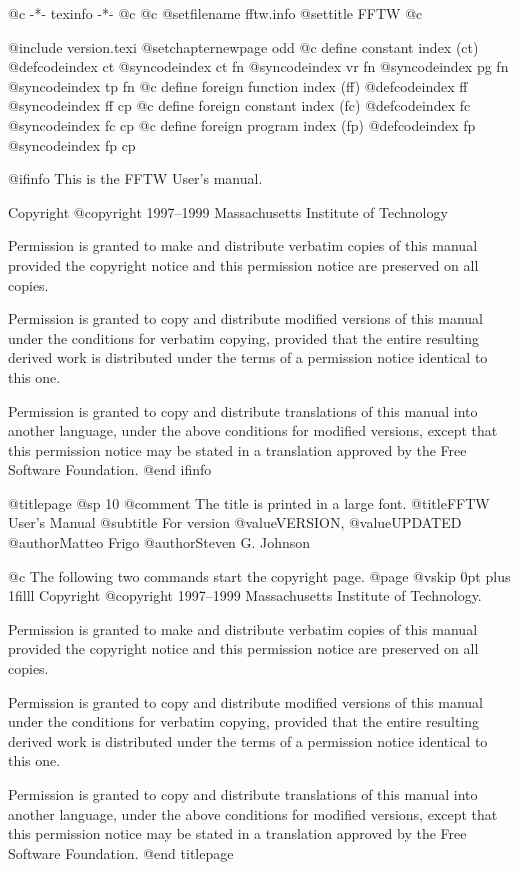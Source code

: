    @c -*- texinfo -*-
@c %
@c %
@setfilename fftw.info
@settitle FFTW
@c %

@include version.texi
@setchapternewpage odd
@c define constant index (ct)
@defcodeindex ct
@syncodeindex ct fn
@syncodeindex vr fn
@syncodeindex pg fn
@syncodeindex tp fn
@c define foreign function index (ff)
@defcodeindex ff
@syncodeindex ff cp
@c define foreign constant index (fc)
@defcodeindex fc
@syncodeindex fc cp
@c define foreign program index (fp)
@defcodeindex fp
@syncodeindex fp cp

@ifinfo
This is the FFTW User's manual.

Copyright @copyright{} 1997--1999 Massachusetts Institute of Technology

Permission is granted to make and distribute verbatim copies of this
manual provided the copyright notice and this permission notice are
preserved on all copies.

Permission is granted to copy and distribute modified versions of this
manual under the conditions for verbatim copying, provided that the
entire resulting derived work is distributed under the terms of a
permission notice identical to this one.

Permission is granted to copy and distribute translations of this manual
into another language, under the above conditions for modified versions,
except that this permission notice may be stated in a translation
approved by the Free Software Foundation.
@end ifinfo

@titlepage
@sp 10
@comment The title is printed in a large font.
@title{FFTW User's Manual}
@subtitle For version @value{VERSION}, @value{UPDATED}
@author{Matteo Frigo}
@author{Steven G. Johnson}

@c The following two commands start the copyright page.
@page
@vskip 0pt plus 1filll
Copyright @copyright{} 1997--1999 Massachusetts Institute of Technology.

Permission is granted to make and distribute verbatim copies of this
manual provided the copyright notice and this permission notice are
preserved on all copies.

Permission is granted to copy and distribute modified versions of this
manual under the conditions for verbatim copying, provided that the
entire resulting derived work is distributed under the terms of a
permission notice identical to this one.

Permission is granted to copy and distribute translations of this manual
into another language, under the above conditions for modified versions,
except that this permission notice may be stated in a translation
approved by the Free Software Foundation.
@end titlepage


